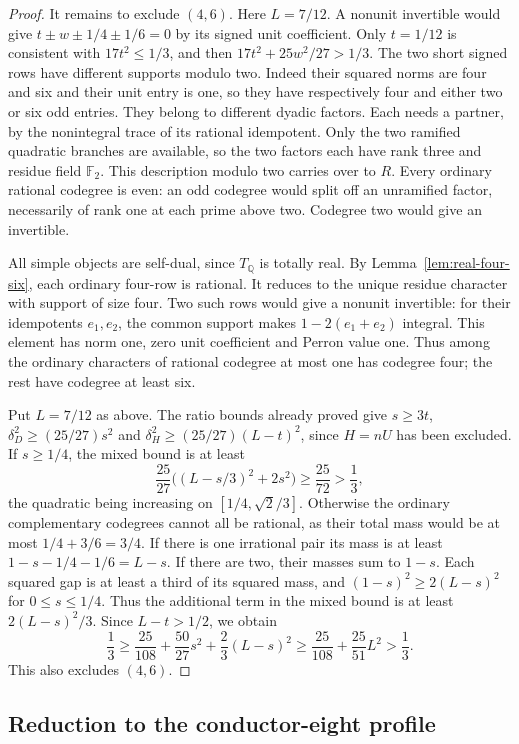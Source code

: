 \documentclass[11pt,reqno]{amsart}
\theoremstyle{remark}\newtheorem{remark}[theorem]{Remark}
\numberwithin{equation}{section}
\begin{document}
\begin{proof}
It remains to exclude $(4,6)$. Here $L=7/12$. A nonunit invertible
would give $t\pm w\pm1/4\pm1/6=0$ by its signed unit coefficient.
Only $t=1/12$ is consistent with $17t^2\le1/3$, and then
$17t^2+25w^2/27>1/3$. The two short signed rows have different supports modulo two.
Indeed their squared norms are four and six and their unit entry is one,
so they have respectively four and either two or six odd entries.
They belong to different dyadic factors. Each needs a partner,
by the nonintegral trace of its rational idempotent. Only the two
ramified quadratic branches are available, so the two factors each
have rank three and residue field $\mathbb F_2$. This description
modulo two carries over to $R$. Every ordinary rational codegree
is even: an odd codegree would split off an unramified factor,
necessarily of rank one at each prime above two. Codegree two would
give an invertible.

All simple objects are self-dual, since $T_{\mathbb Q}$ is totally real.
By Lemma~\ref{lem:real-four-six}, each ordinary four-row is rational.
It reduces to the unique residue character with support of size four.
Two such rows would give a nonunit invertible: for their idempotents
$e_1,e_2$, the common support makes $1-2(e_1+e_2)$ integral.
This element has norm one, zero unit coefficient and Perron value one.
Thus among the ordinary characters of rational codegree at most one
has codegree four; the rest have codegree at least six.

Put $L=7/12$ as above. The ratio bounds already proved give
$s\ge3t$, $\delta_D^2\ge(25/27)s^2$ and
$\delta_H^2\ge(25/27)(L-t)^2$, since $H=nU$ has been excluded.
If $s\ge1/4$, the mixed bound is at least
\[
      \frac{25}{27}\bigl((L-s/3)^2+2s^2\bigr)
      \ge\frac{25}{72}>\frac13 ,
\]
the quadratic being increasing on $[1/4,\sqrt2/3]$. Otherwise
the ordinary complementary codegrees cannot all be rational, as
their total mass would be at most $1/4+3/6=3/4$. If there is one
irrational pair its mass is at least $1-s-1/4-1/6=L-s$.
If there are two, their masses sum to $1-s$. Each squared gap is
at least a third of its squared mass, and
$(1-s)^2\ge2(L-s)^2$ for $0\le s\le1/4$.
Thus the additional term in the mixed bound is at least
$2(L-s)^2/3$. Since $L-t>1/2$, we obtain
\[
 \frac13\ge\frac{25}{108}+\frac{50}{27}s^2+\frac23(L-s)^2
       \ge\frac{25}{108}+\frac{25}{51}L^2>\frac13 .
\]
This also excludes $(4,6)$.
\end{proof}

\subsection{Reduction to the conductor-eight profile}
\end{document}
